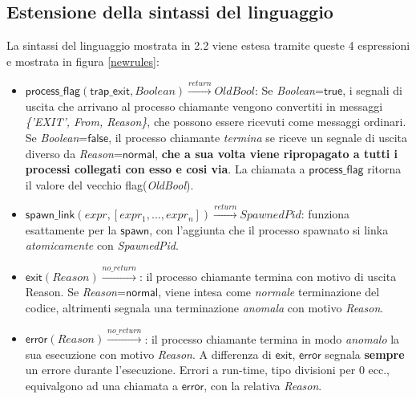 \documentclass[Contributo.tex]{subfiles}
\begin{document}
\subsection{Estensione della sintassi del linguaggio}
La sintassi del linguaggio mostrata in 2.2 viene estesa tramite queste 4 espressioni e mostrata in figura \ref{newrules}:
\begin{itemize}
	\item $\displaystyle \mathsf{process\_flag}(\mathsf{trap\_exit},Boolean)\xrightarrow{return}OldBool$: Se \textit{Boolean}=$\mathsf{true}$, i segnali di uscita che arrivano al processo chiamante vengono convertiti in messaggi \textit{\{'EXIT', From, Reason\}}, che possono essere ricevuti come messaggi ordinari. 
	Se \textit{Boolean}=$\mathsf{false}$, il processo chiamante \textit{termina} se riceve un segnale di uscita diverso da \textit{Reason}=$\mathsf{normal}$, \textbf{che a sua volta viene ripropagato a tutti i processi collegati con esso e cosi via}.
	La chiamata a $\mathsf{process\_flag}$ ritorna il valore del vecchio flag(\textit{OldBool}).
	\item $\displaystyle \mathsf{spawn\_link}(expr, [expr_{1},...,expr_{n}])\xrightarrow{return}SpawnedPid$: funziona esattamente per la $\mathsf{spawn}$, con l'aggiunta che il processo spawnato si linka \textit{atomicamente} con \textit{SpawnedPid}.
	\item $\displaystyle \mathsf{exit}(Reason)\xrightarrow{no\_return}$: il processo chiamante termina con motivo di uscita Reason.
	Se \textit{Reason}=$\mathsf{normal}$, viene intesa come \textit{normale} terminazione del codice, altrimenti segnala una terminazione \textit{anomala} con motivo \textit{Reason}.
	\item $\displaystyle \mathsf{error}(Reason)\xrightarrow{no\_return}$: il processo chiamante termina in modo \textit{anomalo} la sua esecuzione con motivo \textit{Reason}.
	A differenza di $\mathsf{exit}$, $\mathsf{error}$ segnala \textbf{sempre} un errore durante l'esecuzione.
	Errori a run-time, tipo divisioni per 0 ecc., equivalgono ad una chiamata a $\mathsf{error}$, con la relativa \textit{Reason}.
\end{itemize}
\end{document}
